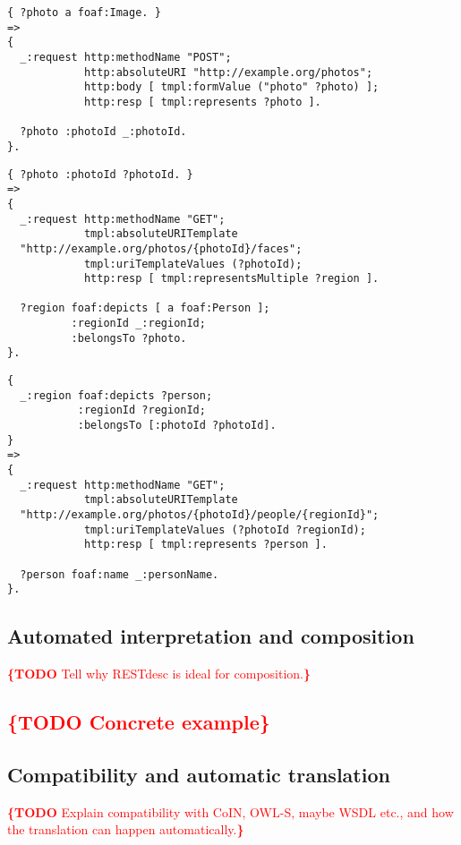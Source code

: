 \documentclass[runningheads,a4paper, twocolumn]{llncs}
\newcommand{\todo}[1]{\noindent\textcolor{red}{{\bf \{TODO} #1{\bf \}}}}
\begin{document}
\begin{lstlisting}[caption=RESTdesc description of photo upload,
                   label=lst:PhotoUpload, float, escapechar=\%]
{ ?photo a foaf:Image. }
=>
{
  _:request http:methodName "POST";
            http:absoluteURI "http://example.org/photos";
            http:body [ tmpl:formValue ("photo" ?photo) ];
            http:resp [ tmpl:represents ?photo ].

  ?photo :photoId _:photoId.
}.
\end{lstlisting}

\begin{lstlisting}[caption=RESTdesc description of face detection,
                   label=lst:FaceDetection, float, escapechar=\%]
{ ?photo :photoId ?photoId. }
=>
{
  _:request http:methodName "GET";
            tmpl:absoluteURITemplate
  "http://example.org/photos/{photoId}/faces";
            tmpl:uriTemplateValues (?photoId);
            http:resp [ tmpl:representsMultiple ?region ].
  
  ?region foaf:depicts [ a foaf:Person ];
          :regionId _:regionId;
          :belongsTo ?photo.
}.
\end{lstlisting}

\begin{lstlisting}[caption=RESTdesc description of face recognition,
                   label=lst:FaceRecognition, float, escapechar=\%, belowskip=-1em]
{
  _:region foaf:depicts ?person;
           :regionId ?regionId;
           :belongsTo [:photoId ?photoId].
}
=>
{
  _:request http:methodName "GET";
            tmpl:absoluteURITemplate
  "http://example.org/photos/{photoId}/people/{regionId}";
            tmpl:uriTemplateValues (?photoId ?regionId);
            http:resp [ tmpl:represents ?person ].
  
  ?person foaf:name _:personName.
}.
\end{lstlisting}


\subsection{Automated interpretation and composition}
\todo{Tell why RESTdesc is ideal for composition.}

\subsection{\todo{Concrete example}}
\label{CompositionExample}

\subsection{Compatibility and automatic translation}
\todo{Explain compatibility with CoIN, OWL-S, maybe WSDL etc., and how the translation can happen automatically.}
\end{document}
